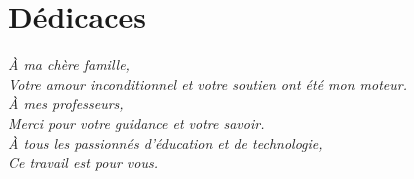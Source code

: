 \chapter*{Dédicaces}
{}
\begin{center}
    \textit{À ma chère famille,} \\
    \textit{Votre amour inconditionnel et votre soutien ont été mon moteur.} \\
    \vspace{1cm}
    \textit{À mes professeurs,} \\
    \textit{Merci pour votre guidance et votre savoir.} \\
    \vspace{1cm}
    \textit{À tous les passionnés d'éducation et de technologie,} \\
    \textit{Ce travail est pour vous.}
\end{center}

